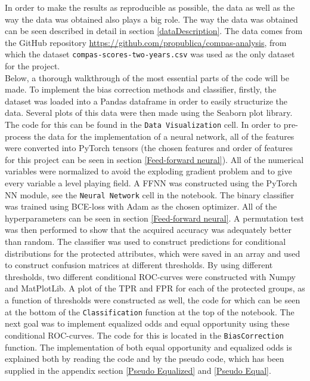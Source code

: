 \documentclass[11pt, fleqn, titlepage]{article}
\begin{document}
	In order to make the results as reproducible as possible, the data as well as the way the data was obtained also plays a big role. The way the data was obtained can be seen described in detail in section \ref{dataDescription}. The data comes from the GitHub repository \url{https://github.com/propublica/compas-analysis}, from which the dataset \texttt{compas-scores-two-years.csv} was used as the only dataset for the project. \\
	
	\noindent Below, a thorough walkthrough of the most essential parts of the code will be made. To implement the bias correction methods and classifier, firstly, the dataset was loaded into a Pandas dataframe in order to easily structurize the data. Several plots of this data were then made using the Seaborn plot library. The code for this can be found in the \texttt{Data Visualization} cell. In order to pre-process the data for the implementation of a neural network, all of the features were converted into PyTorch tensors (the chosen features and order of features for this project can be seen in section \ref{Feed-forward neural}). All of the numerical variables were normalized to avoid the exploding gradient problem and to give every variable a level playing field. A FFNN was constructed using the PyTorch NN module, see the \texttt{Neural Network} cell in the notebook. The binary classifier was trained using BCE-loss with Adam as the chosen optimizer. All of the hyperparameters can be seen in section \ref{Feed-forward neural}. A permutation test was then performed to show that the acquired accuracy was adequately better than random. The classifier was used to construct predictions for conditional distributions for the protected attributes, which were saved in an array and used to construct confusion matrices at different thresholds. By using different thresholds, two  different conditional ROC-curves were constructed with Numpy and MatPlotLib. A plot of the TPR and FPR for each of the protected groups, as a function of thresholds were constructed as well, the code for which can be seen at the bottom of the \texttt{Classification} function at the top of the notebook. The next goal was to implement equalized odds and equal opportunity using these conditional ROC-curves. The code for this is located in the \texttt{BiasCorrection} function. The implementation of both equal opportunity and equalized odds is explained both by reading the code and by the pseudo code, which has been supplied in the appendix section \ref{Pseudo Equalized} and \ref{Pseudo Equal}.
	
\end{document}
